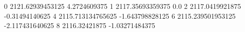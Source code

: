 0 2121.62939453125 4.2724609375
1 2117.35693359375 0.0
2 2117.0419921875 -0.31494140625
4 2115.713134765625 -1.643798828125
6 2115.239501953125 -2.117431640625
8 2116.32421875 -1.03271484375
